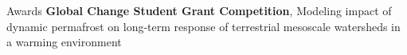 




\begin{rubric}{Awards}
\entry*[2017] \textbf{Global Change Student Grant Competition}, Modeling impact of dynamic permafrost on long-term response of terrestrial mesoscale watersheds in a warming environment

\end{rubric}